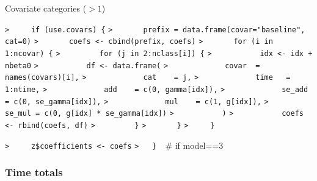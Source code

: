 \documentclass[a4paper]{article}
\begin{document}
Covariate categories ($>1$)\par
\verb~>     if (use.covars) {~\newline
\verb~>       prefix = data.frame(covar="baseline", cat=0)~\newline
\verb~>       coefs <- cbind(prefix, coefs)~\newline
\verb~>       for (i in 1:ncovar) {~\newline
\verb~>         for (j in 2:nclass[i]) {~\newline
\verb~>           idx <- idx + nbeta0~\newline
\verb~>           df <- data.frame(~\newline
\verb~>             covar  = names(covars)[i],~\newline
\verb~>             cat    = j,~\newline
\verb~>             time   = 1:ntime,~\newline
\verb~>             add    = c(0, gamma[idx]),~\newline
\verb~>             se_add = c(0, se_gamma[idx]),~\newline
\verb~>             mul    = c(1, g[idx]),~\newline
\verb~>             se_mul = c(0, g[idx] * se_gamma[idx])~\newline
\verb~>           )~\newline
\verb~>           coefs <- rbind(coefs, df)~\newline
\verb~>         }~\newline
\verb~>       }~\newline
\verb~>     }~\par

\verb~>     z$coefficients <- coefs~\newline
\verb~>   }  ~{\sffamily\# if model==3}\par




\subsubsection{Time totals}\par
\end{document}
